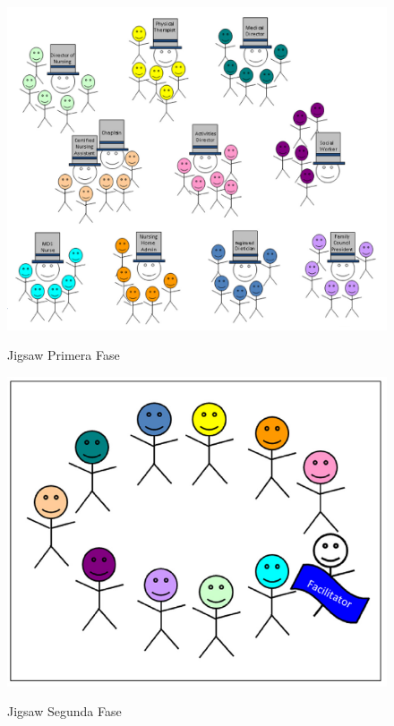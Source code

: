 \begin{figure}[h]
  \centering
  \includegraphics[scale=0.5]{figuras/jigsaw_ltpac_1.png}\\
  \caption[Jigsaw Paso 1]{Jigsaw Primera Fase\protect\cite{Buhr2014429} }
  \label{fig:jigsaw_ltpac_1}
\end{figure}

\begin{figure}[h]
  \centering
  \includegraphics[scale=0.5]{figuras/jigsaw_ltpac_2.png}\\
  \caption[Jigsaw Paso 2]{Jigsaw Segunda Fase\protect\cite{Buhr2014429} }
  \label{fig:jigsaw_ltpac_2}
\end{figure}

